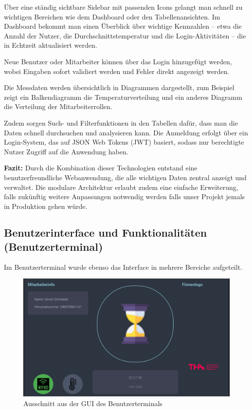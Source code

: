 Über eine ständig sichtbare Sidebar mit passenden Icons gelangt man schnell zu wichtigen Bereichen wie dem Dashboard oder den Tabellenansichten. Im Dashboard bekommt man einen Überblick über wichtige Kennzahlen – etwa die Anzahl der Nutzer, die Durchschnittstemperatur und die Login-Aktivitäten – die in Echtzeit aktualisiert werden. 

\vspace{1em}
\noindent Neue Benutzer oder Mitarbeiter können über das Login hinzugefügt werden, wobei Eingaben sofort validiert werden und Fehler direkt angezeigt werden. 

\vspace{1em}
\noindent Die Messdaten werden übersichtlich in Diagrammen dargestellt, zum Beispiel zeigt ein Balkendiagramm die Temperaturverteilung und ein anderes Diagramm die Verteilung der Mitarbeiterrollen.

\vspace{1em}
\noindent Zudem sorgen Such- und Filterfunktionen in den Tabellen dafür, dass man die Daten schnell durchsuchen und analysieren kann. Die Anmeldung erfolgt über ein Login-System, das auf JSON Web Tokens (JWT) basiert, sodass nur berechtigte Nutzer Zugriff auf die Anwendung haben.

\vspace{1em}
\noindent\textbf{Fazit:}\newline
Durch die Kombination dieser Technologien entstand eine benutzerfreundliche Webanwendung, die alle wichtigen Daten zentral anzeigt und verwaltet. Die modulare Architektur erlaubt zudem eine einfache Erweiterung, falls zukünftig weitere Anpassungen notwendig werden falls unser Projekt jemals in Produktion gehen würde.

\subsection{Benutzerinterface und Funktionalitäten (Benutzerterminal)}

Im Benutzerterminal wurde ebenso das Interface in mehrere Bereiche aufgeteilt.

\begin{figure}[h]
	\centering
	\includegraphics[width=0.4\linewidth]{figures/GUI Benutzerterminal.jpg}
	\caption[GUI Benutzerterminal]{Ausschnitt aus der GUI des Benutzerterminals}\label{fig:gui}
\end{figure}

